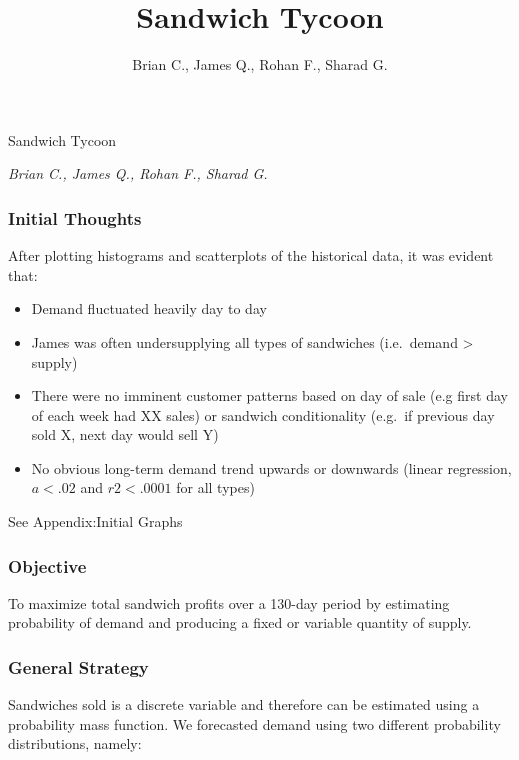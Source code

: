 \documentclass[]{article}
\title{Sandwich Tycoon}
\author{Brian C., James Q., Rohan F., Sharad G.}
\date{}
\begin{document}
\begin{center}
\huge Sandwich Tycoon \\[0.2cm]
\end{center}
\begin{center}
\large \emph{Brian C., James Q., Rohan F., Sharad G.}\\[0.1cm]
\end{center}
\normalsize


\subsubsection{Initial Thoughts}\label{initial-thoughts}

After plotting histograms and scatterplots of the historical data, it
was evident that:

\begin{itemize}
\itemsep1pt\parskip0pt
\item
  Demand fluctuated heavily day to day
\item
  James was often undersupplying all types of sandwiches (i.e.~demand
  \textgreater{} supply)
\item
  There were no imminent customer patterns based on day of sale (e.g
  first day of each week had XX sales) or sandwich conditionality
  (e.g.~if previous day sold X, next day would sell Y)
\item
  No obvious long-term demand trend upwards or downwards (linear
  regression, $a<.02$ and $r2<.0001$ for all types)
\end{itemize}

See Appendix:Initial Graphs

\subsubsection{Objective}\label{objective}

To maximize total sandwich profits over a 130-day period by estimating
probability of demand and producing a fixed or variable quantity of
supply.

\subsubsection{General Strategy}\label{general-strategy}

Sandwiches sold is a discrete variable and therefore can be estimated
using a probability mass function. We forecasted demand using two
different probability distributions, namely:
\end{document}
